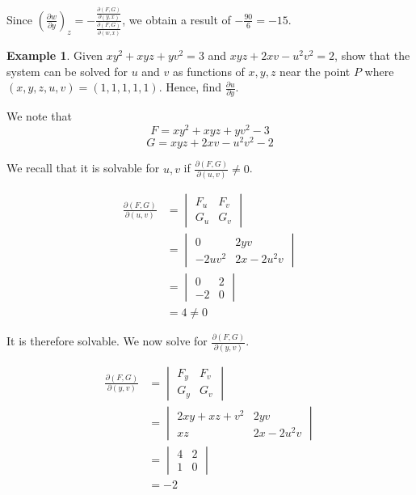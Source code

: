\documentclass[11pt]{article}
\theoremstyle{plain} %
\theoremstyle{definition}
\theoremstyle{example}
\newtheorem*{example}{Example}
\theoremstyle{remark}
\begin{document}
Since $\left(\frac{\partial w}{\partial y}\right)_z = -\frac{\frac{\partial (F,G)}{\partial (y,x)}}{\frac{\partial (F,G)}{\partial (w,x)}}$, we obtain a result of $-\frac{90}{6} = -15$.


\begin{example}
Given $xy^2+xyz+yv^2=3$ and $xyz+2xv-u^2v^2=2$, show that the system can be solved for $u$ and $v$ as functions of $x, y, z$ near the point $P$ where $(x, y, z, u, v) = (1, 1, 1, 1, 1)$. Hence, find $\frac{\partial u}{\partial y}$. 
\end{example}

We note that $$F=xy^2+xyz+yv^2-3$$
$$G = xyz+2xv-u^2v^2-2$$

We recall that it is solvable for $u,v$ if $\frac{\partial (F,G)}{\partial (u, v)} \neq 0$.

\begin{align*}
\frac{\partial (F,G)}{\partial (u, v)} &= \begin{vmatrix}
		F_u & F_v\\
		G_u & G_v
		\end{vmatrix}\\
		&= \begin{vmatrix}
		0 & 2yv\\
		-2uv^2 & 2x-2u^2v
		\end{vmatrix}\\
		&= \begin{vmatrix}
		0 & 2\\
		-2 & 0
		\end{vmatrix}\\
	&= 4 \neq 0
\end{align*}

It is therefore solvable. We now solve for $\frac{\partial (F,G)}{\partial (y, v)}$.

\begin{align*}
\frac{\partial (F,G)}{\partial (y, v)} &= \begin{vmatrix}
		F_y & F_v\\
		G_y & G_v
		\end{vmatrix}\\
		&= \begin{vmatrix}
		2xy+xz+v^2 & 2yv\\
		xz & 2x-2u^2v
		\end{vmatrix}\\
		&= \begin{vmatrix}
		4 & 2\\
		1 & 0
		\end{vmatrix}\\
	&= -2
\end{align*}
\end{document}
